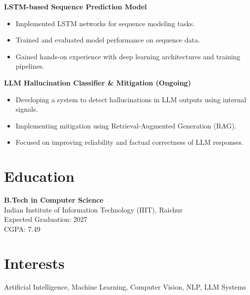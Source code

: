 \documentclass[10pt, a4paper]{article}
\begin{document}
\vspace{4pt}

\textbf{LSTM-based Sequence Prediction Model}
\begin{itemize}[leftmargin=*]
\item Implemented LSTM networks for sequence modeling tasks.
\item Trained and evaluated model performance on sequence data.
\item Gained hands-on experience with deep learning architectures and training pipelines.
\end{itemize}

\vspace{4pt}

\textbf{LLM Hallucination Classifier \& Mitigation (Ongoing)}
\begin{itemize}[leftmargin=*]
\item Developing a system to detect hallucinations in LLM outputs using internal signals.
\item Implementing mitigation using Retrieval-Augmented Generation (RAG).
\item Focused on improving reliability and factual correctness of LLM responses.
\end{itemize}

\section*{Education}
\textbf{B.Tech in Computer Science} \\
Indian Institute of Information Technology (IIIT), Raichur \\
Expected Graduation: 2027 \\
CGPA: 7.49

\section*{Interests}
Artificial Intelligence, Machine Learning, Computer Vision, NLP, LLM Systems
\end{document}
